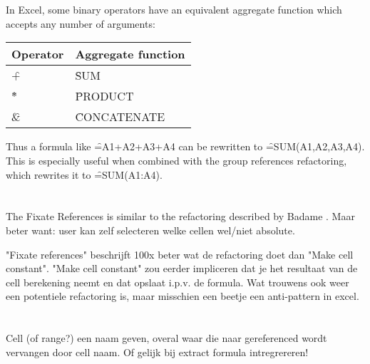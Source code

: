 \section{}

In Excel, some binary operators have an equivalent aggregate function which accepts any number of arguments:

\begin{tabular}{@{}ll@{}}
	\toprule
	Operator & Aggregate function \\
	\midrule
	\f{+} & \f{SUM} \\
	\f{*} & \f{PRODUCT} \\
	\f{\&} & \f{CONCATENATE} \\
	\bottomrule
\end{tabular}

Thus a formula like \f{=A1+A2+A3+A4} can be rewritten to \f{=SUM(A1,A2,A3,A4)}.
This is especially useful when combined with the group references refactoring, which rewrites it to \f{=SUM(A1:A4)}.

\section{}


The Fixate References is similar to the  refactoring described by Badame \cite{badame2012refactoring}.
Maar beter want: user kan zelf selecteren welke cellen wel/niet absolute.

"Fixate references" beschrijft 100x beter wat de refactoring doet dan "Make cell constant". "Make cell constant" zou eerder impliceren dat je het resultaat van de cell berekening neemt en dat opslaat i.p.v. de formula. Wat trouwens ook weer een potentiele refactoring is, maar misschien een beetje een anti-pattern in excel.

\section{}


Cell (of range?) een naam geven, overal waar die naar gereferenced wordt vervangen door cell naam.
Of gelijk bij extract formula intregrereren!